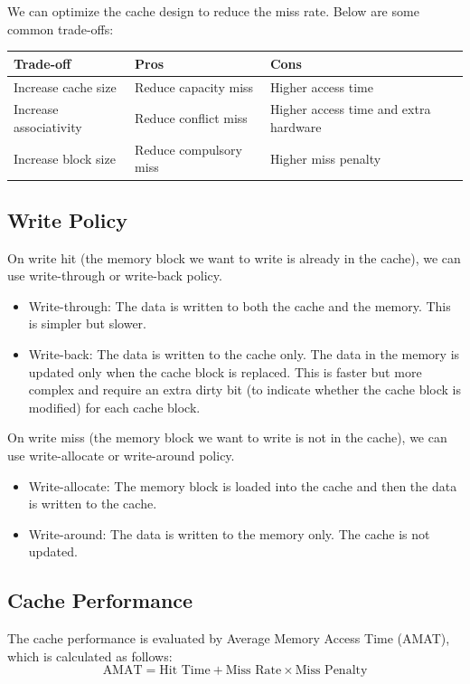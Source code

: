 \documentclass[a4paper,12pt]{article}
\begin{document}
We can optimize the cache design to reduce the miss rate. Below are some common trade-offs:
\begin{table}[H]
	\centering
	\begin{tabular}{lll}
		\toprule
		\textbf{Trade-off} & \textbf{Pros} & \textbf{Cons} \\
		\midrule
		Increase cache size & Reduce capacity miss & Higher access time \\
		Increase associativity & Reduce conflict miss & Higher access time and extra hardware \\
		Increase block size & Reduce compulsory miss & Higher miss penalty \\
		\bottomrule
	\end{tabular}
\end{table}

\subsection{Write Policy}

On write hit (the memory block we want to write is already in the cache), we can use write-through or write-back policy.
\begin{itemize}
	\item Write-through: The data is written to both the cache and the memory. This is simpler but slower.
	\item Write-back: The data is written to the cache only. The data in the memory is updated only when the cache block is replaced. This is faster but more complex and require an extra dirty bit (to indicate whether the cache block is modified) for each cache block.
\end{itemize}

On write miss (the memory block we want to write is not in the cache), we can use write-allocate or write-around policy.
\begin{itemize}
	\item Write-allocate: The memory block is loaded into the cache and then the data is written to the cache.
	\item Write-around: The data is written to the memory only. The cache is not updated.
\end{itemize}

\subsection{Cache Performance}

The cache performance is evaluated by Average Memory Access Time (AMAT), which is calculated as follows:
\begin{equation*}
	\text{AMAT} = \text{Hit Time} + \text{Miss Rate} \times \text{Miss Penalty}
\end{equation*}
\end{document}

